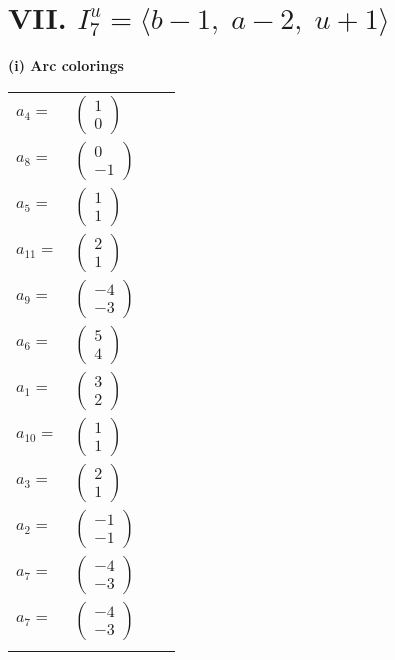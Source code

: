 \documentclass[1p]{elsarticle_modified}
\theoremstyle{definition}
\begin{document}
\centering \section*{VII. $I^u_{7}= \langle b-1,\;a-2,\;u+1 \rangle$}
\flushleft \textbf{(i) Arc colorings}\\
\begin{tabular}{m{7pt} m{180pt} m{7pt} m{180pt} }
\flushright $a_{4}=$&$\begin{pmatrix}1\\0\end{pmatrix}$ \\
\flushright $a_{8}=$&$\begin{pmatrix}0\\-1\end{pmatrix}$ \\
\flushright $a_{5}=$&$\begin{pmatrix}1\\1\end{pmatrix}$ \\
\flushright $a_{11}=$&$\begin{pmatrix}2\\1\end{pmatrix}$ \\
\flushright $a_{9}=$&$\begin{pmatrix}-4\\-3\end{pmatrix}$ \\
\flushright $a_{6}=$&$\begin{pmatrix}5\\4\end{pmatrix}$ \\
\flushright $a_{1}=$&$\begin{pmatrix}3\\2\end{pmatrix}$ \\
\flushright $a_{10}=$&$\begin{pmatrix}1\\1\end{pmatrix}$ \\
\flushright $a_{3}=$&$\begin{pmatrix}2\\1\end{pmatrix}$ \\
\flushright $a_{2}=$&$\begin{pmatrix}-1\\-1\end{pmatrix}$ \\
\flushright $a_{7}=$&$\begin{pmatrix}-4\\-3\end{pmatrix}$\\ \flushright $a_{7}=$&$\begin{pmatrix}-4\\-3\end{pmatrix}$\\&\end{tabular}
\end{document}
